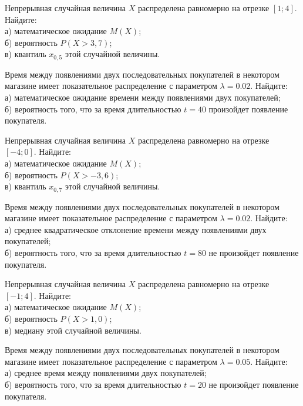 \vfill

\newpage\setcounter{zad}{0}

\z Непрерывная случайная величина $X$ распределена равномерно на отрезке $[1; 4]$. Найдите: \\ \quad а) математическое ожидание $M(X)$; \\ \quad б) вероятность $P(X>3{,}7)$; \\ \quad в) квантиль $x_{0{,}5}$ этой случайной величины.


\vfill

\z Время между появлениями двух последовательных покупателей в некотором магазине имеет показательное распределение с параметром $\lambda = 0.02$. Найдите: \\ \quad а) математическое ожидание времени между появлениями двух покупателей; \\ \quad б) вероятность того, что за время длительностью $t = 40$  произойдет появление покупателя.
 

\vfill

\newpage\setcounter{zad}{0}

\z Непрерывная случайная величина $X$ распределена равномерно на отрезке $[-4; 0]$. Найдите: \\ \quad а) математическое ожидание $M(X)$; \\ \quad б) вероятность $P(X>-3{,}6)$; \\ \quad в) квантиль $x_{0{,}7}$ этой случайной величины.


\vfill

\z Время между появлениями двух последовательных покупателей в некотором магазине имеет показательное распределение с параметром $\lambda = 0.02$. Найдите: \\ \quad а) среднее квадратическое отклонение времени между появлениями двух покупателей; \\ \quad б) вероятность того, что за время длительностью $t = 80$ не произойдет появление покупателя.
 

\vfill

\newpage\setcounter{zad}{0}

\z Непрерывная случайная величина $X$ распределена равномерно на отрезке $[-1; 4]$. Найдите: \\ \quad а) математическое ожидание $M(X)$; \\ \quad б) вероятность $P(X>1{,}0)$; \\ \quad в) медиану этой случайной величины.


\vfill

\z Время между появлениями двух последовательных покупателей в некотором магазине имеет показательное распределение с параметром $\lambda = 0.05$. Найдите: \\ \quad а) среднее время между появлениями двух покупателей; \\ \quad б) вероятность того, что за время длительностью $t = 20$ не произойдет появление покупателя.
 


